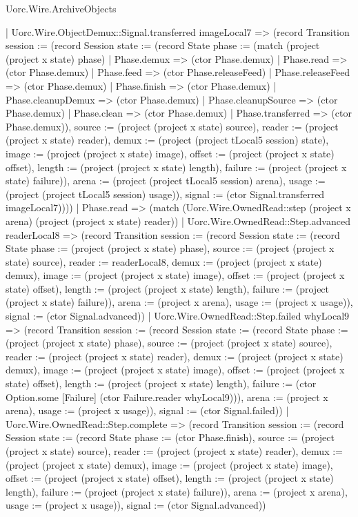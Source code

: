 \begin{lexlean}{Uorc.Wire.ArchiveObjects}
\begin{semanticmodule}
{          | Uorc.Wire.ObjectDemux::Signal.transferred imageLocal7 => (record Transition {session := (record Session {state := (record State {phase := (match (project (project x state) phase)
            | Phase.demux => (ctor Phase.demux)
            | Phase.read => (ctor Phase.demux)
            | Phase.feed => (ctor Phase.releaseFeed)
            | Phase.releaseFeed => (ctor Phase.demux)
            | Phase.finish => (ctor Phase.demux)
            | Phase.cleanupDemux => (ctor Phase.demux)
            | Phase.cleanupSource => (ctor Phase.demux)
            | Phase.clean => (ctor Phase.demux)
            | Phase.transferred => (ctor Phase.demux)), source := (project (project x state) source), reader := (project (project x state) reader), demux := (project (project tLocal5 session) state), image := (project (project x state) image), offset := (project (project x state) offset), length := (project (project x state) length), failure := (project (project x state) failure)}), arena := (project (project tLocal5 session) arena), usage := (project (project tLocal5 session) usage)}), signal := (ctor Signal.transferred imageLocal7)})))
        | Phase.read => (match (Uorc.Wire.OwnedRead::step (project x arena) (project (project x state) reader))
          | Uorc.Wire.OwnedRead::Step.advanced readerLocal8 => (record Transition {session := (record Session {state := (record State {phase := (project (project x state) phase), source := (project (project x state) source), reader := readerLocal8, demux := (project (project x state) demux), image := (project (project x state) image), offset := (project (project x state) offset), length := (project (project x state) length), failure := (project (project x state) failure)}), arena := (project x arena), usage := (project x usage)}), signal := (ctor Signal.advanced)})
          | Uorc.Wire.OwnedRead::Step.failed whyLocal9 => (record Transition {session := (record Session {state := (record State {phase := (project (project x state) phase), source := (project (project x state) source), reader := (project (project x state) reader), demux := (project (project x state) demux), image := (project (project x state) image), offset := (project (project x state) offset), length := (project (project x state) length), failure := (ctor Option.some [Failure] (ctor Failure.reader whyLocal9))}), arena := (project x arena), usage := (project x usage)}), signal := (ctor Signal.failed)})
          | Uorc.Wire.OwnedRead::Step.complete => (record Transition {session := (record Session {state := (record State {phase := (ctor Phase.finish), source := (project (project x state) source), reader := (project (project x state) reader), demux := (project (project x state) demux), image := (project (project x state) image), offset := (project (project x state) offset), length := (project (project x state) length), failure := (project (project x state) failure)}), arena := (project x arena), usage := (project x usage)}), signal := (ctor Signal.advanced)})
}
\end{semanticmodule}
\end{lexlean}
